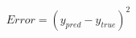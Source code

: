 \documentclass[preview]{standalone}
\begin{document}
\begin{align*}
Error = (y_{pred} - y_{true})^2
\end{align*}
\end{document}
